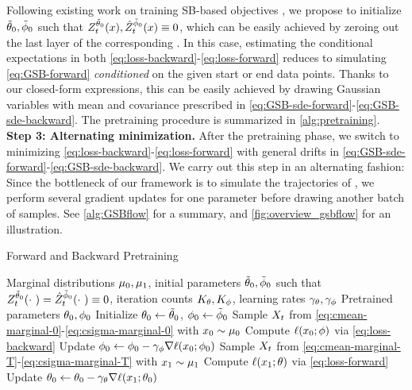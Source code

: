 Following existing work on training \acrshort{SB}-based objectives \citep{chen2021likelihood,de2021diffusion, vargas2021solving}, we propose to initialize $\tilde{\theta}_{0}, \tilde{\phi}_{0}$ such that $\SBf[\ctime][\point][\tilde{\paramf}_{0}], \SBb[\ctime][\point][\tilde{\paramb}_{0}] \equiv 0$, which can be easily achieved by zeroing out the last layer of the corresponding . In this case, estimating the conditional expectations in both \eqref{eq:loss-backward}-\eqref{eq:loss-forward} reduces to simulating \eqref{eq:GSB-forward} \emph{conditioned} on the given start or end data points. Thanks to our closed-form expressions, this can be easily achieved by drawing Gaussian variables with mean and covariance prescribed in  \eqref{eq:GSB-sde-forward}-\eqref{eq:GSB-sde-backward}. The pretraining procedure is summarized in \cref{alg:pretraining}. \\

\textbf{Step 3: Alternating minimization.} After the pretraining phase, we switch to minimizing \eqref{eq:loss-backward}-\eqref{eq:loss-forward} with general drifts in \eqref{eq:GSB-sde-forward}-\eqref{eq:GSB-sde-backward}. We carry out this step in an alternating fashion: Since the bottleneck of our framework is to simulate the trajectories of , we perform several gradient updates for one parameter before drawing another batch of samples. See \cref{alg:GSBflow} for a summary, and \cref{fig:overview_gsbflow} for an illustration.

\begin{algorithm}[t]
   \caption{Forward and Backward Pretraining}
   \label{alg:pretraining}
\begin{algorithmic}
    Marginal distributions $\mu_0, \mu_1$, initial parameters $\tilde{\theta}_{0}, \tilde{\phi}_{0}$ such that $\SBf[\ctime][\cdot\ ][\tilde{\paramf}_0] = \SBb[\ctime][\cdot\ ][\tilde{\paramb}_0] \equiv 0$, iteration counts $K_{\theta}, K_{\phi}$, learning rates $\gamma_{\theta},\gamma_{\phi}$ %
    Pretrained parameters $\theta_0,\phi_0$
   \STATE Initialize $\theta_0 \leftarrow \tilde{\theta}_0$, $\phi_0 \leftarrow \tilde{\phi}_0$
   \STATE Sample $X_{ t }$ from \eqref{eq:cmean-marginal-0}-\eqref{eq:csigma-marginal-0} with $x_0 \sim \mu_0$
   \STATE Compute $\lossb$ via \eqref{eq:loss-backward}
   \STATE Update $\paramb_0 \subs \paramb_0 - \lrb\nabla \lossb[\point_0][\paramb_0]$
   \ENDFOR
   \STATE Sample $X_{ t }$ from \eqref{eq:cmean-marginal-T}-\eqref{eq:csigma-marginal-T} with $x_1 \sim \mu_1$
   \STATE Compute $\lossf$ via \eqref{eq:loss-forward}
   \STATE Update $\paramf_0 \subs \paramf_0 -\lrf \nabla \lossf[\point_\horizon][\paramf_0]$
   \ENDFOR
\end{algorithmic}
\end{algorithm}

